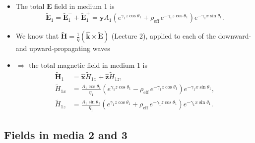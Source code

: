 \documentclass[11pt, oneside]{article}
\begin{document}
\begin{itemize}
\begin{itemize}
	\end{itemize}
	\item The total $\mathbf{E}$ field in medium 1 is
	\begin{equation}
		\tilde{\mathbf{E}}_1 = \tilde{\mathbf{E}}_1^- + \tilde{\mathbf{E}}_1^+ = \hat{\mathbf{y}}A_1\left(e^{\gamma_1z\cos\theta_1} + \rho_\mathrm{eff}\,e^{-\gamma_1z\cos\theta_1}\right)e^{-\gamma_1x\sin\theta_1}.
	\end{equation}
	\item We know that $\tilde{\mathbf{H}} = \frac{1}{\eta}\left(\hat{\mathbf{k}}\times\tilde{\mathbf{E}}\right)$ (Lecture 2), applied to each of the downward- and upward-propagating waves
	\item[] $\Rightarrow$ the total magnetic field in medium 1 is
	\begin{align}
		\tilde{\mathbf{H}}_1 &= \hat{\mathbf{x}}\tilde{H}_{1x} + \hat{\mathbf{z}}\tilde{H}_{1z}, \\
		\tilde{H}_{1x} &= \frac{A_1\cos\theta_1}{\eta_1}\left(e^{\gamma_1z\cos\theta_1} - \rho_\mathrm{eff}\,e^{-\gamma_1z\cos\theta_1}\right)e^{-\gamma_1x\sin\theta_1}, \label{e:H1x}\\
		\tilde{H}_{1z} &= \frac{A_1\sin\theta_1}{\eta_1}\left(e^{\gamma_1z\cos\theta_1} + \rho_\mathrm{eff}\,e^{-\gamma_1z\cos\theta_1}\right)e^{-\gamma_1x\sin\theta_1}.
	\end{align}
\end{itemize}

\subsection{Fields in media 2 and 3}
\end{document}
